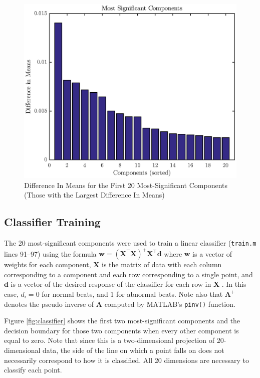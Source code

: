 \documentclass[titlepage,12pt,letter]{article}
\begin{document}
\begin{figure}[hpbt]
    \centering
    \includegraphics[height=0.41\textheight]{../figures/train_04}
    \caption{Difference In Means for the First 20 Most-Significant Components
    (Those with the Largest Difference In Means)}
    \label{fig:sig}
\end{figure}

\subsection{Classifier Training}
The 20 most-significant components were used to train a linear classifier
(\verb`train.m` lines 91--97) using the formula $\mathbf{w} = (\mathbf{X}^\top
\mathbf{X})^+ \mathbf{X}^\top \mathbf{d}$ where $\mathbf{w}$ is a vector of
weights for each component, $\mathbf{X}$ is the matrix of data with each column
corresponding to a component and each row corresponding to a single point, and
$\mathbf{d}$ is a vector of the desired response of the classifier for each row
in $\mathbf{X}$ \cite{demo}.  In this case, $d_i = 0$ for normal beats, and 1
for abnormal beats.  Note also that $\mathbf{A}^+$ denotes the pseudo inverse of
$\mathbf{A}$ computed by MATLAB's \verb`pinv()` function.  

Figure \ref{fig:classifier} shows
the first two most-significant components and the decision boundary for those
two components when every other component is equal to zero.  Note that since
this is a two-dimensional projection of 20-dimensional data, the side of the
line on which a point falls on does not necessarily correspond to how it is
classified.  All 20 dimensions are necessary to classify each point.  
\end{document}

